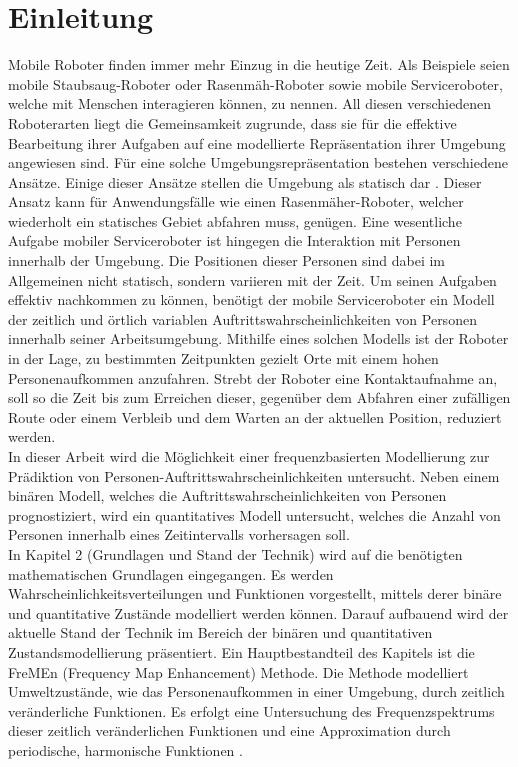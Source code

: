 \chapter{Einleitung}
Mobile Roboter finden immer mehr Einzug in die heutige Zeit. Als Beispiele seien mobile Staubsaug-Roboter oder Rasenmäh-Roboter sowie mobile Serviceroboter, welche mit Menschen interagieren können, zu nennen. All diesen verschiedenen Roboterarten liegt die Gemeinsamkeit zugrunde, dass sie für die effektive Bearbeitung ihrer Aufgaben auf eine modellierte Repräsentation ihrer Umgebung angewiesen sind. Für eine solche Umgebungsrepräsentation bestehen verschiedene Ansätze. Einige dieser Ansätze stellen die Umgebung als statisch dar \cite{Lakemeyer.2003}.  Dieser Ansatz kann für Anwendungsfälle wie einen Rasenmäher-Roboter, welcher wiederholt ein statisches Gebiet abfahren muss, genügen. Eine wesentliche Aufgabe mobiler Serviceroboter ist hingegen die Interaktion mit Personen innerhalb der Umgebung. Die Positionen dieser Personen sind dabei im Allgemeinen nicht statisch, sondern variieren mit der Zeit. Um seinen Aufgaben effektiv nachkommen zu können, benötigt der mobile Serviceroboter ein Modell der zeitlich und örtlich variablen Auftrittswahrscheinlichkeiten von Personen innerhalb seiner Arbeitsumgebung. Mithilfe eines solchen Modells ist der Roboter in der Lage, zu bestimmten Zeitpunkten gezielt Orte mit einem hohen Personenaufkommen anzufahren. Strebt der Roboter eine Kontaktaufnahme an, soll so die Zeit bis zum Erreichen dieser, gegenüber dem Abfahren einer zufälligen Route oder einem Verbleib und dem Warten an der aktuellen Position, reduziert werden. \\
In dieser Arbeit wird die Möglichkeit einer frequenzbasierten Modellierung zur Prädiktion von Personen-Auftrittswahrscheinlichkeiten untersucht. Neben einem binären Modell, welches die Auftrittswahrscheinlichkeiten von Personen prognostiziert, wird ein quantitatives Modell untersucht, welches die Anzahl von Personen innerhalb eines Zeitintervalls vorhersagen soll.  \\
In Kapitel 2 (Grundlagen und Stand der Technik) wird  auf die benötigten mathematischen Grundlagen eingegangen. Es werden Wahrscheinlichkeitsverteilungen und Funktionen vorgestellt, mittels derer binäre und quantitative Zustände modelliert werden können. Darauf aufbauend wird der aktuelle Stand der Technik im Bereich der binären und quantitativen Zustandsmodellierung präsentiert. Ein Hauptbestandteil des Kapitels ist die FreMEn (Frequency Map Enhancement) Methode. Die Methode modelliert Umweltzustände, wie das Personenaufkommen in einer Umgebung, durch zeitlich veränderliche Funktionen. Es erfolgt eine Untersuchung des Frequenzspektrums dieser zeitlich veränderlichen Funktionen und eine Approximation durch periodische, harmonische Funktionen \cite{Krajnik.2014}. \\
